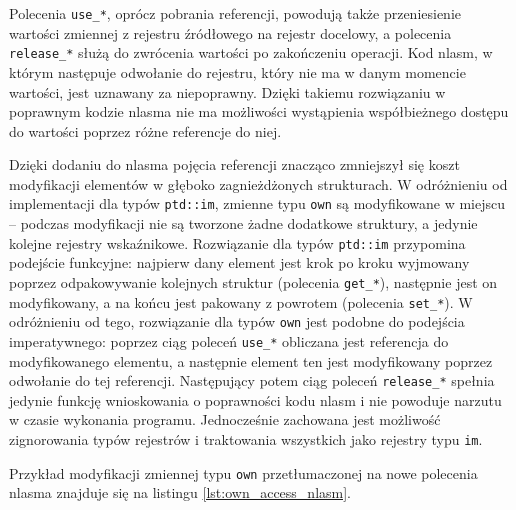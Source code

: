\documentclass[licencjacka]{pracamgr}
\begin{document}
Polecenia \texttt{use\_*}, oprócz pobrania referencji, powodują także przeniesienie wartości zmiennej z rejestru
źródłowego na rejestr docelowy, a polecenia \texttt{release\_*} służą do zwrócenia wartości po zakończeniu
operacji. Kod nlasm, w którym następuje odwołanie do rejestru, który nie ma w danym momencie wartości,
jest uznawany za niepoprawny. Dzięki takiemu rozwiązaniu w poprawnym kodzie nlasma nie ma możliwości wystąpienia
współbieżnego dostępu do wartości poprzez różne referencje do niej.

Dzięki dodaniu do nlasma pojęcia referencji znacząco zmniejszył się koszt modyfikacji elementów w głęboko
zagnieżdżonych strukturach. W odróżnieniu od implementacji dla typów \texttt{ptd::im}, zmienne typu \texttt{own}
są modyfikowane w miejscu -- podczas modyfikacji nie są tworzone żadne dodatkowe struktury, a jedynie
kolejne rejestry wskaźnikowe. Rozwiązanie dla typów \texttt{ptd::im} przypomina podejście funkcyjne:
najpierw dany element jest krok po kroku wyjmowany poprzez odpakowywanie kolejnych struktur
(polecenia \texttt{get\_*}), następnie jest on modyfikowany, a na końcu jest pakowany z powrotem (polecenia
\texttt{set\_*}). W odróżnieniu od tego, rozwiązanie dla typów \texttt{own} jest podobne do podejścia
imperatywnego: poprzez ciąg poleceń \texttt{use\_*} obliczana jest referencja do modyfikowanego elementu, a
następnie element ten jest modyfikowany poprzez odwołanie do tej referencji.
Następujący potem ciąg poleceń \texttt{release\_*}
spełnia jedynie funkcję wnioskowania o poprawności kodu nlasm i nie powoduje narzutu w czasie wykonania programu.
Jednocześnie zachowana jest możliwość zignorowania typów rejestrów i traktowania wszystkich jako rejestry
typu \texttt{im}.

Przykład modyfikacji zmiennej typu \texttt{own} przetłumaczonej na nowe polecenia nlasma znajduje się na listingu 
\ref{lst:own_access_nlasm}.
\end{document}
